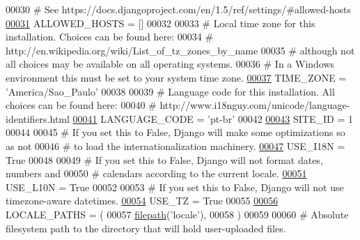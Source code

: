 \begin{DoxyCode}
00030 \textcolor{comment}{# See https://docs.djangoproject.com/en/1.5/ref/settings/#allowed-hosts}
\hypertarget{settings_8py_source_l00031}{}\hyperlink{namespaceELO_1_1settings_afd72644768367440ae1a89e9fe95cde5}{00031} ALLOWED\_HOSTS = []
00032 
00033 \textcolor{comment}{# Local time zone for this installation. Choices can be found here:}
00034 \textcolor{comment}{# http://en.wikipedia.org/wiki/List\_of\_tz\_zones\_by\_name}
00035 \textcolor{comment}{# although not all choices may be available on all operating systems.}
00036 \textcolor{comment}{# In a Windows environment this must be set to your system time zone.}
\hypertarget{settings_8py_source_l00037}{}\hyperlink{namespaceELO_1_1settings_aafd318ffa70db1890eaf1f8621e19d53}{00037} TIME\_ZONE = \textcolor{stringliteral}{'America/Sao\_Paulo'}
00038 
00039 \textcolor{comment}{# Language code for this installation. All choices can be found here:}
00040 \textcolor{comment}{# http://www.i18nguy.com/unicode/language-identifiers.html}
\hypertarget{settings_8py_source_l00041}{}\hyperlink{namespaceELO_1_1settings_a388841a63bae5418e55fb741f938d4fb}{00041} LANGUAGE\_CODE = \textcolor{stringliteral}{'pt-br'}
00042 
\hypertarget{settings_8py_source_l00043}{}\hyperlink{namespaceELO_1_1settings_a31328123344da3768e97b0ac61c342de}{00043} SITE\_ID = 1
00044 
00045 \textcolor{comment}{# If you set this to False, Django will make some optimizations so as not}
00046 \textcolor{comment}{# to load the internationalization machinery.}
\hypertarget{settings_8py_source_l00047}{}\hyperlink{namespaceELO_1_1settings_a2d03ced1be44b9d7937bdbc870474ffe}{00047} USE\_I18N = \textcolor{keyword}{True}
00048 
00049 \textcolor{comment}{# If you set this to False, Django will not format dates, numbers and}
00050 \textcolor{comment}{# calendars according to the current locale.}
\hypertarget{settings_8py_source_l00051}{}\hyperlink{namespaceELO_1_1settings_a863197f2699808509a4c32b38c16eb44}{00051} USE\_L10N = \textcolor{keyword}{True}
00052 
00053 \textcolor{comment}{# If you set this to False, Django will not use timezone-aware datetimes.}
\hypertarget{settings_8py_source_l00054}{}\hyperlink{namespaceELO_1_1settings_a8da4c6fc66af84d08bddc0249a473553}{00054} USE\_TZ = \textcolor{keyword}{True}
00055 
\hypertarget{settings_8py_source_l00056}{}\hyperlink{namespaceELO_1_1settings_a977570dd2e9cd8142b3d65c4fa37c172}{00056} LOCALE\_PATHS = (
00057     \hyperlink{namespaceELO_1_1settings_a7730264ddd478343e0f282f36d4a5ab4}{filepath}(\textcolor{stringliteral}{'locale'}),
00058 )
00059 
00060 \textcolor{comment}{# Absolute filesystem path to the directory that will hold user-uploaded files.}

\end{DoxyCode}
